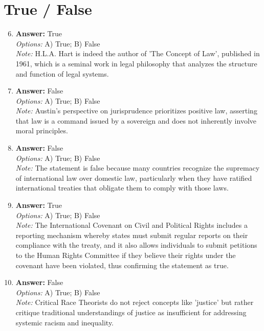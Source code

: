\documentclass[12pt]{article}
\begin{document}
\section*{True / False}
\begin{enumerate}[label=\arabic*.]
\setcounter{enumi}{5}
\item \textbf{Answer:} True
\\ \textit{Options:} A) True; B) False
\\ \textit{Note:} H.L.A. Hart is indeed the author of 'The Concept of Law', published in 1961, which is a seminal work in legal philosophy that analyzes the structure and function of legal systems.
\item \textbf{Answer:} False
\\ \textit{Options:} A) True; B) False
\\ \textit{Note:} Austin's perspective on jurisprudence prioritizes positive law, asserting that law is a command issued by a sovereign and does not inherently involve moral principles.
\item \textbf{Answer:} False
\\ \textit{Options:} A) True; B) False
\\ \textit{Note:} The statement is false because many countries recognize the supremacy of international law over domestic law, particularly when they have ratified international treaties that obligate them to comply with those laws.
\item \textbf{Answer:} True
\\ \textit{Options:} A) True; B) False
\\ \textit{Note:} The International Covenant on Civil and Political Rights includes a reporting mechanism whereby states must submit regular reports on their compliance with the treaty, and it also allows individuals to submit petitions to the Human Rights Committee if they believe their rights under the covenant have been violated, thus confirming the statement as true.
\item \textbf{Answer:} False
\\ \textit{Options:} A) True; B) False
\\ \textit{Note:} Critical Race Theorists do not reject concepts like 'justice' but rather critique traditional understandings of justice as insufficient for addressing systemic racism and inequality.
\end{enumerate}
\end{document}

